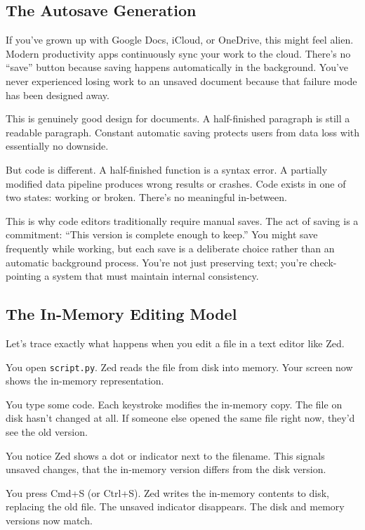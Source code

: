 \documentclass[
  letterpaper,
  DIV=11,
  numbers=noendperiod]{scrreprt}
\begin{document}
\subsection{The Autosave Generation}\label{the-autosave-generation}

If you've grown up with Google Docs, iCloud, or OneDrive, this might
feel alien. Modern productivity apps continuously sync your work to the
cloud. There's no ``save'' button because saving happens automatically
in the background. You've never experienced losing work to an unsaved
document because that failure mode has been designed away.

This is genuinely good design for documents. A half-finished paragraph
is still a readable paragraph. Constant automatic saving protects users
from data loss with essentially no downside.

But code is different. A half-finished function is a syntax error. A
partially modified data pipeline produces wrong results or crashes. Code
exists in one of two states: working or broken. There's no meaningful
in-between.

This is why code editors traditionally require manual saves. The act of
saving is a commitment: ``This version is complete enough to keep.'' You
might save frequently while working, but each save is a deliberate
choice rather than an automatic background process. You're not just
preserving text; you're check-pointing a system that must maintain
internal consistency.

\subsection{The In-Memory Editing
Model}\label{the-in-memory-editing-model}

Let's trace exactly what happens when you edit a file in a text editor
like Zed.

You open \texttt{script.py}. Zed reads the file from disk into memory.
Your screen now shows the in-memory representation.

You type some code. Each keystroke modifies the in-memory copy. The file
on disk hasn't changed at all. If someone else opened the same file
right now, they'd see the old version.

You notice Zed shows a dot or indicator next to the filename. This
signals unsaved changes, that the in-memory version differs from the
disk version.

You press Cmd+S (or Ctrl+S). Zed writes the in-memory contents to disk,
replacing the old file. The unsaved indicator disappears. The disk and
memory versions now match.
\end{document}

